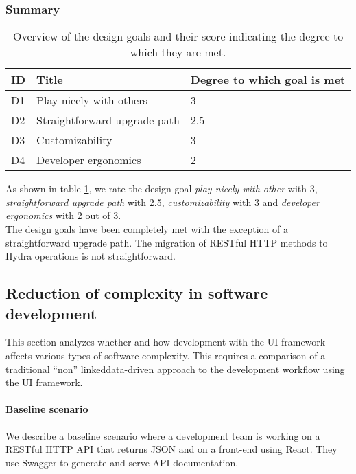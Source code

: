 \subsubsection{Summary}

\begin{table}[!htb]
  \begin{center}
    \begin{tabular}{|l|l|l|}
      \hline
      \textbf{ID} & \textbf{Title} & \textbf{Degree to which goal is met} \\
      \hline
      D1 & Play nicely with others & 3 \\
      \hline
      D2 & Straightforward upgrade path & 2.5 \\
      \hline
      D3 & Customizability & 3 \\
      \hline
      D4 & Developer ergonomics & 2 \\
      \hline
    \end{tabular}
    \caption{Overview of the design goals and their score indicating the degree to which they are met.}
    \label{tab:designgoalscomplexity}
  \end{center}
\end{table}

As shown in table \ref{tab:designgoalscomplexity}, we rate the design goal \textit{play nicely with other} with 3, \textit{straightforward upgrade path} with 2.5, \textit{customizability} with 3 and \textit{developer ergonomics} with 2 out of 3. \\ The design goals have been completely met with the exception of a straightforward upgrade path. The migration of RESTful HTTP methods to Hydra operations is not straightforward.

\subsection{Reduction of complexity in software development}
This section analyzes whether and how development with the UI framework affects various types of software complexity. This requires a comparison of a traditional ``non'' \gls{linkeddata}-driven approach to the development workflow using the UI framework.

\paragraph{Baseline scenario} We describe a baseline scenario where a development team is working on a RESTful HTTP API that returns JSON and on a front-end using React. They use Swagger to generate and serve API documentation.


